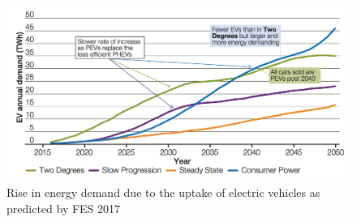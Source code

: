 \begin{figure}\centering
	\includegraphics{_introduction/fig/electricity-demand-ev}
	\caption{Rise in energy demand due to the uptake of electric vehicles as predicted by FES 2017 \cite{FES2017}}
	\label{ch-introduction:fig:electricity-demand-ev}
\end{figure}